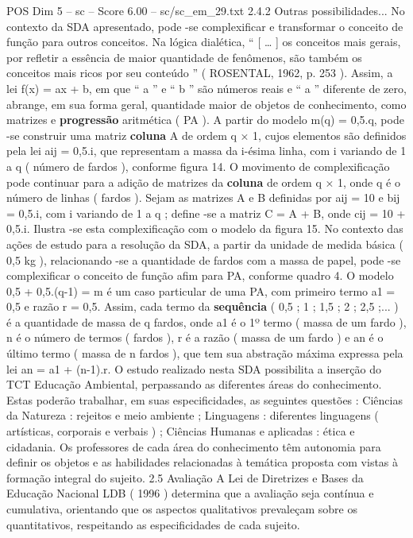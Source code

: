 \begin{textsample}{POS Dim 5 – sc – Score 6.00 – sc/sc\_em\_29.txt}  \label{ex:f5_pos_038}
2.4.2 Outras possibilidades...
No contexto da SDA apresentado, pode -se complexificar e transformar o conceito de função para outros conceitos.
Na lógica dialética, “ [ … ] os conceitos mais gerais, por refletir a essência de maior quantidade de fenômenos, são também os conceitos mais ricos por seu conteúdo ” ( ROSENTAL, 1962, p. 253 ).
Assim, a lei f(x) = ax + b, em que “ a ” e “ b ” são números reais e “ a ” diferente de zero, abrange, em sua forma geral, quantidade maior de objetos de conhecimento, como matrizes e \textbf{progressão} aritmética ( PA ).
A partir do modelo m(q) = 0,5.q, pode -se construir uma matriz \textbf{coluna} A de ordem q × 1, cujos elementos são definidos pela lei aij = 0,5.i, que representam a massa da i-ésima linha, com i variando de 1 a q ( número de fardos ), conforme figura 14.
O movimento de complexificação pode continuar para a adição de matrizes da \textbf{coluna} de ordem q × 1, onde q é o número de linhas ( fardos ).
Sejam as matrizes A e B definidas por aij = 10 e bij = 0,5.i, com i variando de 1 a q ; define -se a matriz C = A + B, onde cij = 10 + 0,5.i.
Ilustra -se esta complexificação com o modelo da figura 15.
No contexto das ações de estudo para a resolução da SDA, a partir da unidade de medida básica ( 0,5 kg ), relacionando -se a quantidade de fardos com a massa de papel, pode -se complexificar o conceito de função afim para PA, conforme quadro 4.
O modelo 0,5 + 0,5.(q-1) = m é um caso particular de uma PA, com primeiro termo a1 = 0,5 e razão r = 0,5.
Assim, cada termo da \textbf{sequência} ( 0,5 ; 1 ; 1,5 ; 2 ; 2,5 ;... ) é a quantidade de massa de q fardos, onde a1 é o 1º termo ( massa de um fardo ), n é o número de termos ( fardos ), r é a razão ( massa de um fardo ) e an é o último termo ( massa de n fardos ), que tem sua abstração máxima expressa pela lei an = a1 + (n-1).r.
O estudo realizado nesta SDA possibilita a inserção do TCT Educação Ambiental, perpassando as diferentes áreas do conhecimento.
Estas poderão trabalhar, em suas especificidades, as seguintes questões : Ciências da Natureza : rejeitos e meio ambiente ; Linguagens : diferentes linguagens ( artísticas, corporais e verbais ) ; Ciências Humanas e aplicadas : ética e cidadania.
Os professores de cada área do conhecimento têm autonomia para definir os objetos e as habilidades relacionadas à temática proposta com vistas à formação integral do sujeito. 2.5 Avaliação A Lei de Diretrizes e Bases da Educação Nacional LDB ( 1996 ) determina que a avaliação seja contínua e cumulativa, orientando que os aspectos qualitativos prevaleçam sobre os quantitativos, respeitando as especificidades de cada sujeito.

\end{textsample}
